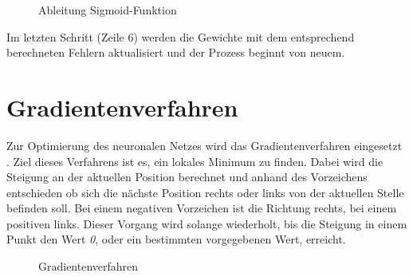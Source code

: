\begin{figure}[h!]
	\begin{center}
	\caption{Ableitung Sigmoid-Funktion}
	\label{derivesigmoid}
	\end{center}
\end{figure}

Im letzten Schritt (Zeile 6) werden die Gewichte mit dem entsprechend berechneten Fehlern aktualisiert und der Prozess beginnt von neuem.

\newpage

\section{Gradientenverfahren}
\label{chap_gradient}
Zur Optimierung des neuronalen Netzes wird das Gradientenverfahren eingesetzt . Ziel dieses Verfahrens ist es, ein lokales Minimum zu finden. Dabei wird die Steigung an der aktuellen Position berechnet und anhand des Vorzeichens entschieden ob sich die nächste Position rechts oder links von der aktuellen Stelle befinden soll. Bei einem negativen Vorzeichen ist die Richtung rechts, bei einem positiven links. Dieser Vorgang wird solange wiederholt, bis die Steigung in einem Punkt den Wert \emph{0}, oder ein bestimmten vorgegebenen Wert, erreicht.

\begin{figure}[h!]
	\begin{center}
	\caption{Gradientenverfahren}
	\label{gradient}
	\end{center}
\end{figure}

